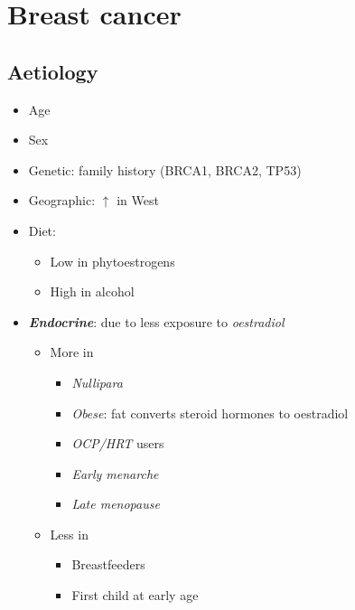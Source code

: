 \documentclass[
  12pt,
]{memoir}
\providecommand{\tightlist}{%
  \setlength{\itemsep}{0pt}\setlength{\parskip}{0pt}}
\begin{document}
\pagebreak

\hypertarget{breast-cancer}{%
\chapter{Breast cancer}\label{breast-cancer}}

\hypertarget{aetiology}{%
\section{Aetiology}\label{aetiology}}

\begin{itemize}
\tightlist
\item
  Age
\item
  Sex
\item
  Genetic: family history (BRCA1, BRCA2, TP53)
\item
  Geographic: \(\uparrow\) in West
\item
  Diet:

  \begin{itemize}
  \tightlist
  \item
    Low in phytoestrogens
  \item
    High in alcohol
  \end{itemize}
\item
  \textbf{\emph{Endocrine}}: due to less exposure to \emph{oestradiol}

  \begin{itemize}
  \tightlist
  \item
    More in

    \begin{itemize}
    \tightlist
    \item
      \emph{Nullipara}
    \item
      \emph{Obese}: fat converts steroid hormones to oestradiol
    \item
      \emph{OCP/HRT} users
    \item
      \emph{Early menarche}
    \item
      \emph{Late menopause}
    \end{itemize}
  \item
    Less in

    \begin{itemize}
    \tightlist
    \item
      Breastfeeders
    \item
      First child at early age
    \end{itemize}
  \end{itemize}
\end{itemize}
\end{document}
